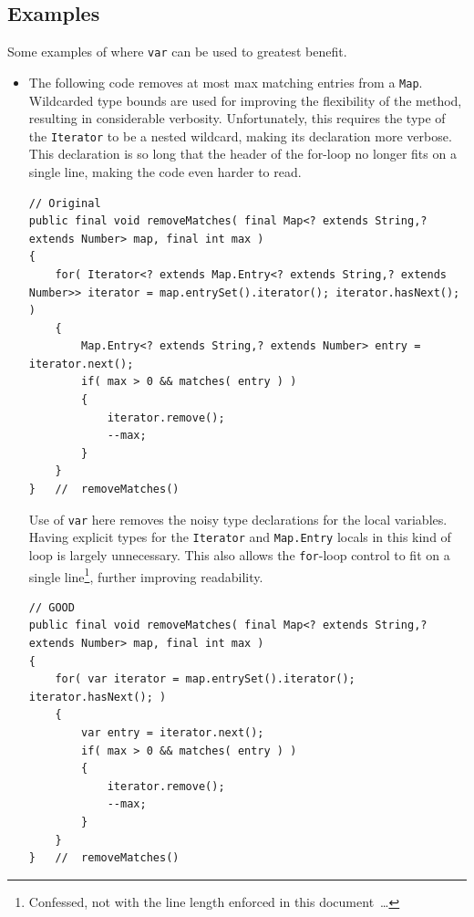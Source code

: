 
\subsection{Examples}
Some examples of where \lstinline|var| can be used to greatest benefit.

\begin{itemize}
\item{The following code removes at most max matching entries from a \lstinline|Map|\autocite{ORACLE_DOC_MAP_INTERFACE}. Wildcarded type bounds are used for improving the flexibility of the method, resulting in considerable verbosity. Unfortunately, this requires the type of the \lstinline|Iterator|\autocite{ORACLE_DOC_ITERATOR_INTERFACE} to be a nested wildcard, making its declaration more verbose. This declaration is so long that the header of the for-loop no longer fits on a single line, making the code even harder to read.
\begin{lstlisting}
// Original
public final void removeMatches( final Map<? extends String,? extends Number> map, final int max ) 
{
    for( Iterator<? extends Map.Entry<? extends String,? extends Number>> iterator = map.entrySet().iterator(); iterator.hasNext(); ) 
    {
        Map.Entry<? extends String,? extends Number> entry = iterator.next();
        if( max > 0 && matches( entry ) ) 
        {
            iterator.remove();
            --max;
        }
    }
}   //  removeMatches()
\end{lstlisting}

Use of \lstinline|var| here removes the noisy type declarations for the local variables. Having explicit types for the \lstinline|Iterator| and \lstinline|Map.Entry|\autocite{ORACLE_DOC_MAP.ENTRY_INTERFACE} locals in this kind of loop is largely unnecessary. This also allows the \lstinline|for|-loop control to fit on a single line\footnote{Confessed, not with the line length enforced in this document~…}, further improving readability.
\begin{lstlisting}
// GOOD
public final void removeMatches( final Map<? extends String,? extends Number> map, final int max ) 
{
    for( var iterator = map.entrySet().iterator(); iterator.hasNext(); ) 
    {
        var entry = iterator.next();
        if( max > 0 && matches( entry ) ) 
        {
            iterator.remove();
            --max;
        }
    }
}   //  removeMatches()
\end{lstlisting}}


\end{itemize}
